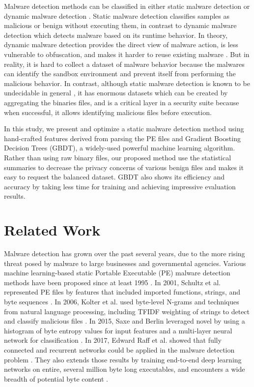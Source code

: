 \documentclass[runningheads]{llncs}
\begin{document}
Malware detection methods can be classified in either static malware detection or dynamic malware detection \cite{egele2012survey}. 
Static malware detection classifies samples as malicious or benign without executing them, in contrast to dynamic malware detection which detects malware based on its runtime behavior. 
In theory, dynamic malware detection provides the direct view of malware action, is less vulnerable to obfuscation, and makes it harder to reuse existing malware \cite{moser2007limits}. 
But in reality, it is hard to collect a dataset of malware behavior because the malwares can identify the sandbox environment and prevent itself from performing the malicious behavior. 
In contrast, although static malware detection is known to be undecidable in general \cite{cohen1987computer}, it has enormous datasets which can be created by aggregating the binaries files, and is a critical layer in a security suite because when successful, it allows identifying malicious files before execution.

In this study, we present and optimize a static malware detection method using hand-crafted features derived from parsing the PE files and Gradient Boosting Decision Trees (GBDT), a widely-used powerful machine learning algorithm.
Rather than using raw binary files, our proposed method use the statistical summaries to decrease the privacy concerns of various benign files and makes it easy to request the balanced dataset. 
GBDT also shows its efficiency and accuracy by taking less time for training and achieving impressive evaluation results.

\section{Related Work}

Malware detection has grown over the past several years, due to the more rising threat posed by malware to large businesses and governmental agencies. 
Various machine learning-based static Portable Executable (PE) malware detection methods have been proposed since at least 1995 \cite{kephart1995biologically,schultz2001data,kolter2006learning,saxe2015deep,raff2017malware}. 
In 2001, Schultz et al. represented PE files by features that included imported functions, strings, and byte sequences \cite{schultz2001data}. In 2006, Kolter et al. used byte-level N-grams and techniques from natural language processing, including TFIDF weighting of strings to detect and classify malicious files \cite{kolter2006learning}. In 2015, Saxe and Berlin  leveraged novel by using a histogram of byte entropy values for input features and a multi-layer neural network for classification \cite{saxe2015deep}. In 2017, Edward Raff et al. showed that fully connected and recurrent networks could be applied in the malware detection problem \cite{raff2017learning}. They also extends those results by training end-to-end deep learning networks on entire, several million byte long executables, and encounters a wide breadth of potential byte content \cite{raff2017malware}.
\end{document}
